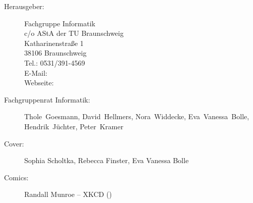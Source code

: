 
\begin{description}
\item[Herausgeber:]
	Fachgruppe Informatik\\
	c/o AStA der TU Braunschweig\\
	Katharinenstraße 1\\
	38106 Braunschweig\\
	Tel.: 0531/391-4569\\
	E-Mail: \\
	Webseite: \fginfoUrl
\item[Fachgruppenrat Informatik:] Thole~Goesmann, David~Hellmers, Nora~Widdecke, Eva~Vanessa~Bolle, Hendrik~Jüchter, Peter~Kramer 
\item[Cover:] Sophia Scholtka, Rebecca Finster, Eva Vanessa Bolle

\item[Comics:] Randall Munroe -- XKCD ()
\end{description}
